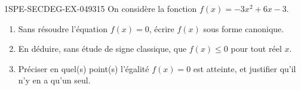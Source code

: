 \begin{exercice}{1SPE-SECDEG-EX-049}{3}{15}
On considère la fonction $f(x) = -3x^2 + 6x - 3$.

\begin{enumerate}
  \item Sans résoudre l'équation $f(x) = 0$, écrire $f(x)$ sous forme canonique.
  \item En déduire, sans étude de signe classique, que $f(x) \leqslant 0$ pour tout réel $x$.
  \item Préciser en quel(s) point(s) l'égalité $f(x) = 0$ est atteinte, et justifier qu'il n'y en a qu'un seul.
\end{enumerate}
\end{exercice}
